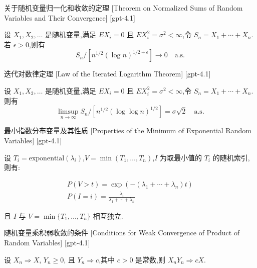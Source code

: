 \documentclass[UTF8]{ctexart}
\begin{document}
    
    
    \begin{thm}
        {关于随机变量归一化和收敛的定理}
        [Theorem on Normalized Sums of Random Variables and Their Convergence]
        [gpt-4.1]
        
设 $X_{1}, X_{2}, \dots$ 是随机变量,满足 $E X_{i} = 0$ 且 $E X_{i}^{2} = \sigma^{2} < \infty$,令 $S_{n} = X_{1} + \cdots + X_{n}$.若 $\epsilon > 0$,则有
\[
S_{n} / \left[ n^{1/2} (\log n)^{1/2 + \epsilon} \right] \to 0 \quad \mathrm{a.s.}
\]

    \end{thm}
    
    
    
    \begin{thm}
        {迭代对数律定理}
        [Law of the Iterated Logarithm Theorem]
        [gpt-4.1]
        
设 $X_{1}, X_{2}, \dots$ 是随机变量,满足 $E X_{i} = 0$ 且 $E X_{i}^{2} = \sigma^{2} < \infty$,令 $S_{n} = X_{1} + \cdots + X_{n}$.则有
\[
\limsup_{n \to \infty} S_{n} / \left[ n^{1/2} (\log \log n)^{1/2} \right] = \sigma \sqrt{2} \quad \mathrm{a.s.}
\]

    \end{thm}
    
    
    
    \begin{thm}
        {最小指数分布变量及其性质}
        [Properties of the Minimum of Exponential Random Variables]
        [gpt-4.1]
        
设 $T_i = \mathrm{exponential}(\lambda_i)$,$V = \operatorname*{min}(T_1, \dots, T_n)$,$I$ 为取最小值的 $T_i$ 的随机索引,则有:

\[
\begin{array}{l}
P(V > t) = \exp(-(\lambda_1 + \cdots + \lambda_n)t) \\
P(I = i) = \displaystyle \frac{\lambda_i}{\lambda_1 + \cdots + \lambda_n}
\end{array}
\]

且 $I$ 与 $V = \operatorname*{min}\{T_1, \dots, T_n\}$ 相互独立.

    \end{thm}
    
    
    
    \begin{thm}
        {随机变量乘积弱收敛的条件}
        [Conditions for Weak Convergence of Product of Random Variables]
        [gpt-4.1]
        
设 $X_{n} \Rightarrow X$, $Y_{n} \geq 0$, 且 $Y_{n} \Rightarrow c$,其中 $c > 0$ 是常数,则 $X_{n} Y_{n} \Rightarrow cX$.

    \end{thm}
    
\end{document}
